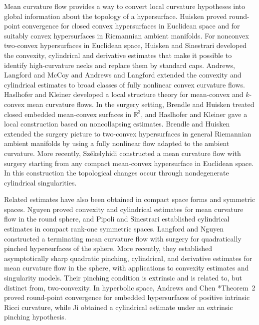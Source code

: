 \documentclass[11pt,reqno]{amsart}
\theoremstyle{definition}
\theoremstyle{remark}
\numberwithin{equation}{section}
\begin{document}
Mean curvature flow provides a way to convert local curvature hypotheses into
global information about the topology of a hypersurface.  Huisken
\cites{Hui84,Hui86} proved round-point convergence for closed convex
hypersurfaces in Euclidean space and for suitably convex hypersurfaces in
Riemannian ambient manifolds.  For nonconvex two-convex hypersurfaces in
Euclidean space, Huisken and Sinestrari
\cites{HS99sing,HS99conv,HS09} developed the convexity, cylindrical and
derivative estimates that make it possible to identify high-curvature necks
and replace them by standard caps.  Andrews, Langford and McCoy \cite{ALM14}
and Andrews and Langford \cite{AL14} extended the convexity and cylindrical
estimates to broad classes of fully nonlinear convex curvature flows.
Haslhofer and Kleiner \cite{HK17mean} developed a local structure theory for
mean-convex and $k$-convex mean curvature flows.  In the surgery setting,
Brendle and Huisken \cite{BH16} treated closed embedded mean-convex surfaces
in $\mathbb R^3$, and Haslhofer and Kleiner \cite{HK17} gave a local
construction based on noncollapsing estimates.  Brendle and Huisken
\cite{BH17} extended the surgery picture to two-convex hypersurfaces in
general Riemannian ambient manifolds by using a fully nonlinear flow adapted
to the ambient curvature. More recently, Sz\'ekelyhidi
\cite{Szekelyhidi26} constructed a mean curvature flow with surgery starting
from any compact mean-convex hypersurface in Euclidean space.  In this
construction the topological changes occur through nondegenerate cylindrical
singularities.

Related estimates have also been obtained in compact space forms and
symmetric spaces.  Nguyen \cite{Nguyen15} proved convexity and cylindrical
estimates for mean curvature flow in the round sphere, and Pipoli and
Sinestrari \cite{PS17} established cylindrical estimates in compact rank-one
symmetric spaces.  Langford and Nguyen \cite{LN21} constructed a terminating
mean curvature flow with surgery for quadratically pinched hypersurfaces of
the sphere.  More recently, they \cite{LN25} established
asymptotically sharp quadratic pinching, cylindrical, and derivative
estimates for mean curvature flow in the sphere, with applications to
convexity estimates and singularity models.  Their pinching condition is
extrinsic and is related to, but distinct from, two-convexity.  In hyperbolic
space, Andrews and Chen
\cite{AC17}*{Theorem~2} proved round-point convergence for embedded
hypersurfaces of positive intrinsic Ricci curvature, while Ji \cite{Ji21}
obtained a cylindrical estimate under an extrinsic pinching hypothesis.
\end{document}
